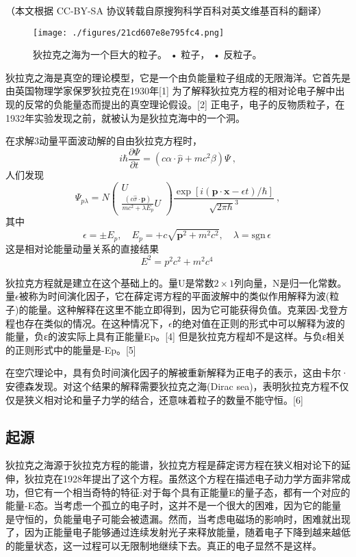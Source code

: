 
（本文根据 CC-BY-SA 协议转载自原搜狗科学百科对英文维基百科的翻译）

\begin{figure}[ht]
\centering
\texttt{[image: ./figures/21cd607e8e795fc4.png]}
\caption{狄拉克之海为一个巨大的粒子。 • 粒子， • 反粒子。} \label{fig_DLKZH_1}
\end{figure}

狄拉克之海是真空的理论模型，它是一个由负能量粒子组成的无限海洋。它首先是由英国物理学家保罗狄拉克在1930年[1] 为了解释狄拉克方程的相对论电子解中出现的反常的负能量态而提出的真空理论假设。[2] 正电子，电子的反物质粒子，在1932年实验发现之前，就被认为是狄拉克海中的一个洞。

在求解3动量平面波动解的自由狄拉克方程时，
$$i \hbar \frac{\partial \Psi}{\partial t} = (c \alpha \cdot \hat{p} + mc^2 \beta) \Psi~,$$
人们发现
$$\Psi_{p \lambda} = N \left( \begin{array}{c}    U \\    \frac{(c \hat{\sigma} \cdot \mathbf{p})}{mc^2 + \lambda E_p} U \end{array} \right)\frac{\exp\left[ i ( \mathbf{p} \cdot \mathbf{x} - \epsilon t ) / \hbar \right]}{\sqrt{2 \pi \hbar}^3}~,$$
其中
$$\epsilon = \pm E_p, \quad E_p = +c \sqrt{\mathbf{p}^2 + m^2 c^2}, \quad \lambda = \text{sgn} \, \epsilon~$$
这是相对论能量动量关系的直接结果
$$E^2 = p^2 c^2 + m^2 c^4~$$

狄拉克方程就是建立在这个基础上的。量U是常数$2\times1$列向量，N是归一化常数。量$\epsilon$被称为时间演化因子，它在薛定谔方程的平面波解中的类似作用解释为波(粒子)的能量。这种解释在这里不能立即得到，因为它可能获得负值。克莱因-戈登方程也存在类似的情况。在这种情况下，$\epsilon$的绝对值在正则的形式中可以解释为波的能量，负ε的波实际上具有正能量Ep。[4] 但是狄拉克方程却不是这样。与负ε相关的正则形式中的能量是-Ep。[5]

在空穴理论中，具有负时间演化因子的解被重新解释为正电子的表示，这由卡尔·安德森发现。对这个结果的解释需要狄拉克之海(Dirac sea)，表明狄拉克方程不仅仅是狭义相对论和量子力学的结合，还意味着粒子的数量不能守恒。[6]

\subsection{起源}
狄拉克之海源于狄拉克方程的能谱，狄拉克方程是薛定谔方程在狭义相对论下的延伸，狄拉克在1928年提出了这个方程。虽然这个方程在描述电子动力学方面非常成功，但它有一个相当奇特的特征:对于每个具有正能量E的量子态，都有一个对应的能量-E态。当考虑一个孤立的电子时，这并不是一个很大的困难，因为它的能量是守恒的，负能量电子可能会被遗漏。然而，当考虑电磁场的影响时，困难就出现了，因为正能量电子能够通过连续发射光子来释放能量，随着电子下降到越来越低的能量状态，这一过程可以无限制地继续下去。真正的电子显然不是这样。


